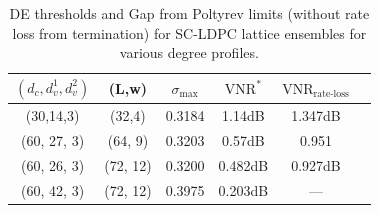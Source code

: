 \documentclass[journal]{IEEEtran}
\begin{document}
\begin{table}
\centering
\caption{DE thresholds and Gap from Poltyrev limits (without rate loss from termination) for SC-LDPC lattice ensembles for various degree profiles.}
\begin{tabular}{c c c c c c}
\hline  \hline
$(d_{c},d_{v}^{1},d_{v}^{2})$ &(L,w)& $\sigma_{\text{max}}$ &$\text{VNR}^{*}$ &$\text{VNR}_{\text{rate-loss}}$\\
\hline
(30,14,3) & (32,4) & 0.3184 & 1.14dB & 1.347dB\\
(60, 27, 3)& (64, 9)  &  0.3203 & 0.57dB & 0.951\\
(60, 26, 3)& (72, 12) & 0.3200 &0.482dB & 0.927dB\\
(60, 42, 3)& (72, 12) & 0.3975 & 0.203dB &---\\
\end{tabular}
\label{Table:Thresholds}
\end{table}
\end{document}
